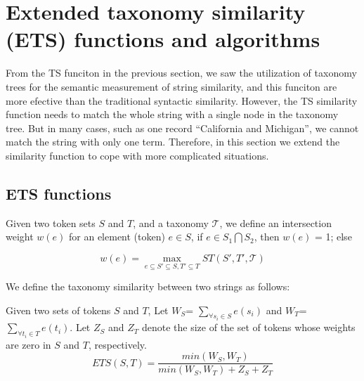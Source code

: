 
\section{Extended taxonomy similarity (ETS) functions and algorithms}

From the TS funciton in the previous section, we saw the utilization of taxonomy trees for the semantic measurement of string similarity, and this funciton are more efective than the traditional syntactic similarity. However, the TS similarity function needs to match the whole string with a single node in the taxonomy tree. But in many cases, such as one record ``California and Michigan'', we cannot match the string with only one term. Therefore, in this section we extend the similarity function to cope with more complicated situations.






\subsection{ETS functions}




\begin{definition}
Given two token sets $S$ and $T$, and a taxonomy $\mathcal{T}$, we define  an intersection weight $w(e)$ for an element (token) $e \in S$,  if $e \in S_1 \bigcap S_2$, then $w(e)$ = 1; else
 
 \begin{equation}
w(e)=  \max \limits_{e \subseteq S' \subseteq S, T' \subseteq T} ST(S',T',\mathcal{T})
\end{equation} 

\end{definition}




We define the taxonomy similarity between two strings as follows:


\begin{definition}   Given two sets of tokens $S$ and $T$,  Let $W_S$= $\sum_{\forall s_i \in S} e(s_i)$ and $W_T$= $\sum_{ \forall t_i \in T} e(t_i)$. Let $Z_S$ and $Z_T$ denote the size of the set of tokens whose weights are zero in $S$ and $T$, respectively.
\begin{equation}
ETS(S,T)=  \frac{min(W_S,W_T)}{min(W_S,W_T)+Z_S+Z_T}
\end{equation} \end{definition}




